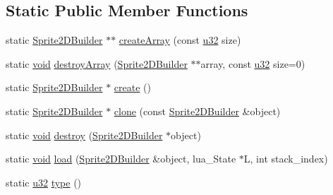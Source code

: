 \subsection*{Static Public Member Functions}
\begin{DoxyCompactItemize}
\item 
static \mbox{\hyperlink{classnjli_1_1_sprite2_d_builder}{Sprite2\+D\+Builder}} $\ast$$\ast$ \mbox{\hyperlink{classnjli_1_1_sprite2_d_builder_a63a3840175f91013b143deb9873d61bd}{create\+Array}} (const \mbox{\hyperlink{_util_8h_a10e94b422ef0c20dcdec20d31a1f5049}{u32}} size)
\item 
static \mbox{\hyperlink{_thread_8h_af1e856da2e658414cb2456cb6f7ebc66}{void}} \mbox{\hyperlink{classnjli_1_1_sprite2_d_builder_a7b2e0f8407cf1456c5d67c76b5f44b45}{destroy\+Array}} (\mbox{\hyperlink{classnjli_1_1_sprite2_d_builder}{Sprite2\+D\+Builder}} $\ast$$\ast$array, const \mbox{\hyperlink{_util_8h_a10e94b422ef0c20dcdec20d31a1f5049}{u32}} size=0)
\item 
static \mbox{\hyperlink{classnjli_1_1_sprite2_d_builder}{Sprite2\+D\+Builder}} $\ast$ \mbox{\hyperlink{classnjli_1_1_sprite2_d_builder_aacf13bcd07b7ae227754dc774967be8d}{create}} ()
\item 
static \mbox{\hyperlink{classnjli_1_1_sprite2_d_builder}{Sprite2\+D\+Builder}} $\ast$ \mbox{\hyperlink{classnjli_1_1_sprite2_d_builder_ae1bafb46b2edf1d64ff578d99bf1c3ed}{clone}} (const \mbox{\hyperlink{classnjli_1_1_sprite2_d_builder}{Sprite2\+D\+Builder}} \&object)
\item 
static \mbox{\hyperlink{_thread_8h_af1e856da2e658414cb2456cb6f7ebc66}{void}} \mbox{\hyperlink{classnjli_1_1_sprite2_d_builder_a685094b311445e1054f92720b6629dae}{destroy}} (\mbox{\hyperlink{classnjli_1_1_sprite2_d_builder}{Sprite2\+D\+Builder}} $\ast$object)
\item 
static \mbox{\hyperlink{_thread_8h_af1e856da2e658414cb2456cb6f7ebc66}{void}} \mbox{\hyperlink{classnjli_1_1_sprite2_d_builder_a22c448719aa48d5724640684b6b3b4b6}{load}} (\mbox{\hyperlink{classnjli_1_1_sprite2_d_builder}{Sprite2\+D\+Builder}} \&object, lua\+\_\+\+State $\ast$L, int stack\+\_\+index)
\item 
static \mbox{\hyperlink{_util_8h_a10e94b422ef0c20dcdec20d31a1f5049}{u32}} \mbox{\hyperlink{classnjli_1_1_sprite2_d_builder_a7804c520fd7ccac9d391bb95ae5cc1c1}{type}} ()
\end{DoxyCompactItemize}
